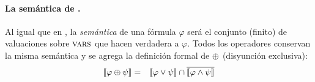 \paragraph{La semántica de \gramboolxor.}

Al igual que en \grambool, la {\em semántica} de una fórmula $\varphi$ será el conjunto (finito) de valuaciones sobre $\textsc{vars}$ que hacen verdadera a $\varphi$. Todos los operadores conservan la misma semántica y se agrega la definición formal de $\oplus$ (disyunción exclusiva):
%
\begin{eqnarray*}
\llbracket \varphi\oplus\psi\rrbracket &=& \llbracket \varphi\vee\psi\rrbracket\cap \overline{\llbracket \varphi\wedge\psi\rrbracket}\\
\end{eqnarray*}








